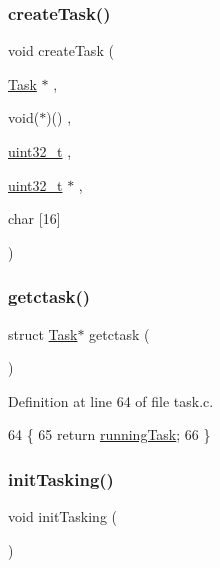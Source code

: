 \subsubsection{\texorpdfstring{create\+Task()}{createTask()}}
{\footnotesize\ttfamily void create\+Task (\begin{DoxyParamCaption}\item[{\hyperlink{a00151}{Task} $\ast$}]{,  }\item[{void($\ast$)()}]{,  }\item[{\hyperlink{a00104_a435d1572bf3f880d55459d9805097f62_a435d1572bf3f880d55459d9805097f62}{uint32\+\_\+t}}]{,  }\item[{\hyperlink{a00104_a435d1572bf3f880d55459d9805097f62_a435d1572bf3f880d55459d9805097f62}{uint32\+\_\+t} $\ast$}]{,  }\item[{char}]{\mbox{[}16\mbox{]} }\end{DoxyParamCaption})}

\mbox{\label{a00059_a5913e9b2190b2b4118ee020721a320e2_a5913e9b2190b2b4118ee020721a320e2}} 
\subsubsection{\texorpdfstring{getctask()}{getctask()}}
{\footnotesize\ttfamily struct \hyperlink{a00151}{Task}$\ast$ getctask (\begin{DoxyParamCaption}{ }\end{DoxyParamCaption})}



Definition at line 64 of file task.\+c.


\begin{DoxyCode}
64                         \{
65     \textcolor{keywordflow}{return} \hyperlink{a00056_a2c195d425b4a6791b3a89f7b219f93d9_a2c195d425b4a6791b3a89f7b219f93d9}{runningTask};
66 \}
\end{DoxyCode}
\mbox{\label{a00059_aea945e91746a54801f4763ad264746b9_aea945e91746a54801f4763ad264746b9}} 
\subsubsection{\texorpdfstring{init\+Tasking()}{initTasking()}}
{\footnotesize\ttfamily void init\+Tasking (\begin{DoxyParamCaption}{ }\end{DoxyParamCaption})}




